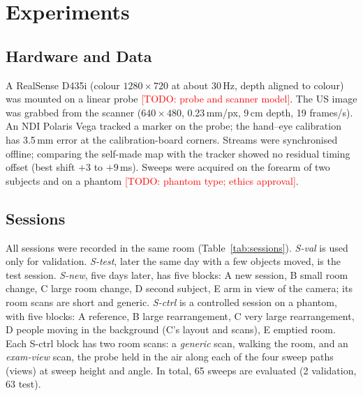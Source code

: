 \documentclass[journal]{IEEEtran}
\newcommand{\tbd}[1]{\textcolor{red}{[TODO: #1]}}
\newcommand{\Sval}{S-val}
\newcommand{\Stest}{S-test}
\newcommand{\Snew}{S-new}
\newcommand{\Sctrl}{S-ctrl}
\begin{document}
\section{Experiments}
\label{sec:experiments}

\subsection{Hardware and Data}
\label{sec:data}
A RealSense D435i (colour $1280\times720$ at about 30\,Hz, depth aligned to colour) was mounted on a linear probe \tbd{probe and scanner model}. The US image was grabbed from the scanner ($640\times480$, 0.23\,mm/px, 9\,cm depth, 19 frames/s). An NDI Polaris Vega tracked a marker on the probe; the hand--eye calibration has 3.5\,mm error at the calibration-board corners. Streams were synchronised offline; comparing the self-made map with the tracker showed no residual timing offset (best shift $+3$ to $+9$\,ms). Sweeps were acquired on the forearm of two subjects and on a phantom \tbd{phantom type; ethics approval}.

\subsection{Sessions}
\label{sec:sessions}
All sessions were recorded in the same room (Table~\ref{tab:sessions}). \emph{\Sval{}} is used only for validation. \emph{\Stest{}}, later the same day with a few objects moved, is the test session. \emph{\Snew{}}, five days later, has five blocks: A new session, B small room change, C large room change, D second subject, E arm in view of the camera; its room scans are short and generic. \emph{\Sctrl{}} is a controlled session on a phantom, with five blocks: A reference, B large rearrangement, C very large rearrangement, D people moving in the background (C's layout and scans), E emptied room. Each \Sctrl{} block has two room scans: a \emph{generic} scan, walking the room, and an \emph{exam-view} scan, the probe held in the air along each of the four sweep paths (views) at sweep height and angle. In total, 65 sweeps are evaluated (2 validation, 63 test).
\end{document}

